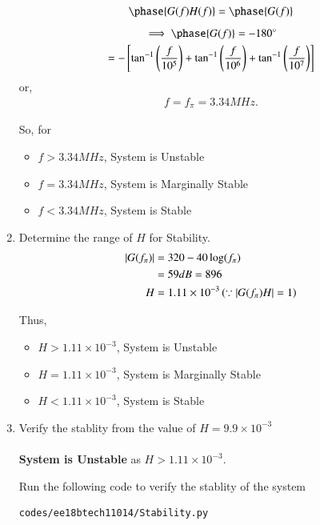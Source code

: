 \begin{enumerate}[label=\thesection.\arabic*.,ref=\thesection.\theenumi]
\begin{align}
\phase{G(f)H(f)} = \phase{G(f)}
\end{align}
\begin{multline}
\implies \phase{G(f)} = -180\degree
\\
=-\sbrak{\tan ^{-1}\brak{\frac{f}{10^{5}}}+\tan ^{-1}\brak{\frac{f}{10^{6}}}+\tan ^{-1}\brak{\frac{f}{10^{7}}}}
\end{multline}
or,
\begin{align}
f = f_{\pi} = 3.34 M Hz.
\end{align}

So, for 
\begin{itemize}
\item $f > 3.34 M Hz$, System is Unstable
\item $f = 3.34 M Hz$, System is Marginally Stable
\item $f < 3.34 M Hz$, System is Stable
\end{itemize}
\item Determine the range of $H$ for Stability.\\
\solution
\begin{align}
\left\vert G(f_{\pi})\right\vert &= 320 - 40\log(f_{\pi})\\
 &= 59 dB = 896\\
H &= 1.11 \times 10^{-3} \left(\because \left\vert G(f_{\pi})H\right\vert = 1\right)
\end{align}


Thus, 
\begin{itemize}
\item $H > 1.11 \times 10^{-3}$, System is Unstable
\item $H = 1.11 \times 10^{-3}$, System is Marginally Stable
\item $H < 1.11 \times 10^{-3}$, System is Stable
\end{itemize}

\item Verify the stablity from the value of $H=9.9\times 10^{-3}$\\
\solution\\
\textbf{System is Unstable} as $H>1.11\times 10^{-3}$.

Run the following code to verify the stablity of the system
\begin{lstlisting}
codes/ee18btech11014/Stability.py
\end{lstlisting}


\end{enumerate}
